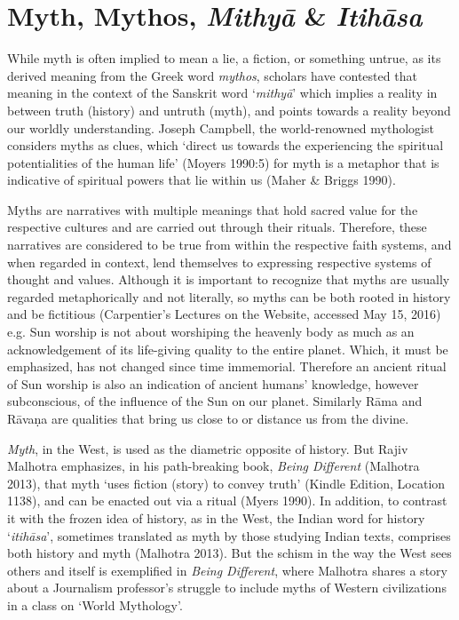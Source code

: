 \section*{Myth, Mythos, \textit{Mithyā} \& \textit{Itihāsa}}

While myth is often implied to mean a lie, a fiction, or something untrue, as its derived meaning from the Greek word \textit{mythos}, scholars have contested that meaning in the context of the Sanskrit word ‘\textit{mithyā}’ which implies a reality in between truth (history) and untruth (myth), and points towards a reality beyond our worldly understanding. Joseph Campbell, the world-renowned mythologist considers myths as clues, which ‘direct us towards the experiencing the spiritual potentialities of the human life’ (Moyers 1990:5) for myth is a metaphor that is indicative of spiritual powers that lie within us (Maher \& Briggs 1990).

Myths are narratives with multiple meanings that hold sacred value for the respective cultures and are carried out through their rituals. Therefore, these narratives are considered to be true from within the respective faith systems, and when regarded in context, lend themselves to expressing respective systems of thought and values. Although it is important to recognize that myths are usually regarded metaphorically and not literally, so myths can be both rooted in history and be fictitious (Carpentier’s Lectures on the Website, accessed May 15, 2016) e.g. Sun worship is not about worshiping the heavenly body as much as an acknowledgement of its life-giving quality to the entire planet. Which, it must be emphasized, has not changed since time immemorial. Therefore an ancient ritual of Sun worship is also an indication of ancient humans’ knowledge, however subconscious, of the influence of the Sun on our planet. Similarly Rāma and Rāvaṇa are qualities that bring us close to or distance us from the divine.

\textit{Myth}, in the West, is used as the diametric opposite of history. But Rajiv Malhotra emphasizes, in his path-breaking book, \textit{Being Different} (Malhotra 2013), that myth ‘uses fiction (story) to convey truth’ (Kindle Edition, Location 1138), and can be enacted out via a ritual (Myers 1990). In addition, to contrast it with the frozen idea of history, as in the West, the Indian word for history ‘\textit{itihāsa}’, sometimes translated as myth by those studying Indian texts, comprises both history and myth (Malhotra 2013). But the schism in the way the West sees others and itself is exemplified in \textit{Being Different}, where Malhotra shares a story about a Journalism professor’s struggle to include myths of Western civilizations in a class on ‘World Mythology’.


